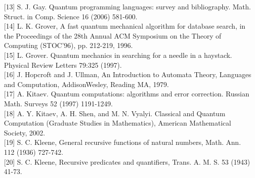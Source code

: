 \documentclass[10pt]{article}
\begin{document}
[13] S. J. Gay. Quantum programming languages: survey and bibliography. Math. Struct. in Comp. Science 16 (2006) 581-600.\\[0pt]
[14] L. K. Grover, A fast quantum mechanical algorithm for database search, in the Proceedings of the 28th Annual ACM Symposium on the Theory of Computing (STOC'96), pp. 212-219, 1996.\\[0pt]
[15] L. Grover. Quantum mechanics in searching for a needle in a haystack. Physical Review Letters 79:325 (1997).\\[0pt]
[16] J. Hopcroft and J. Ullman, An Introduction to Automata Theory, Languages and Computation, AddisonWesley, Reading MA, 1979.\\[0pt]
[17] A. Kitaev. Quantum computations: algorithms and error correction. Russian Math. Surveys 52 (1997) 1191-1249.\\[0pt]
[18] A. Y. Kitaev, A. H. Shen, and M. N. Vyalyi. Classical and Quantum Computation (Graduate Studies in Mathematics), American Mathematical Society, 2002.\\[0pt]
[19] S. C. Kleene, General recursive functions of natural numbers, Math. Ann. 112 (1936) 727-742.\\[0pt]
[20] S. C. Kleene, Recursive predicates and quantifiers, Trans. A. M. S. 53 (1943) 41-73.
\end{document}
